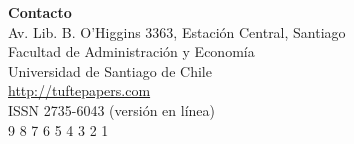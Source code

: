 \documentclass[a4paper]{tufte-book} %
\begin{document}
\begin{fullwidth}
{\noindent \bfseries Contacto}\\
{\noindent Av. Lib. B. O'Higgins 3363, Estación Central, Santiago}\\
{\noindent Facultad de Administración y Economía}\\
{\noindent Universidad de Santiago de Chile}\\
{\noindent {\Large\Mundus} \href{http://tuftepapers.com}{http://tuftepapers.com}}\\

{\noindent ISSN 2735-6043 {\footnotesize (versi\'on en l\'inea)}}\\

{\footnotesize {} \hspace{1mm} 9 \hspace{1mm} \hspace{1mm} 8 \hspace{1mm} 7 \hspace{1mm} 6 \hspace{1mm} 5 \hspace{1mm} 4 \hspace{1mm} 3 \hspace{1mm} 2 \hspace{1mm} 1}
\end{fullwidth}
\end{document}
